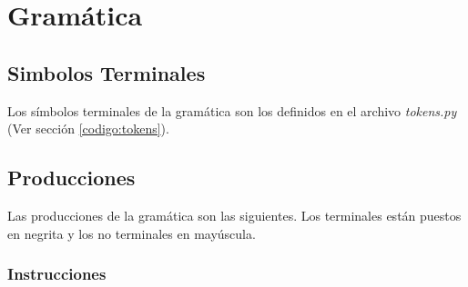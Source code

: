 \section{Gramática}
\label{sec:gramatica}

\subsection{Simbolos Terminales}
	Los símbolos terminales de la gramática son los definidos en el archivo 
	\textit{tokens.py} (Ver sección \ref{codigo:tokens}).

\subsection{Producciones}
	Las producciones de la gramática son las siguientes. Los terminales
	están puestos en negrita y los no terminales en mayúscula.
\newToken{\SEMICOLON}{;}
\newToken{\LPARENT}{(}
\newToken{\RPARENT}{)}
\newToken{\LBRACKET}{[}
\newToken{\RBRACKET}{]}
\newToken{\LBRACE}{\{}
\newToken{\RBRACE}{\}}
\newToken{\ADD}{+}
\newToken{\MULT}{*}
\newToken{\COMMA}{,}
\newToken{\SUB}{-}
\newToken{\DIV}{/}
\newToken{\COLON}{:}
\newToken{\LAMBDA}{$\lambda$}
\newToken{\LEQ}{$<=$}
\newToken{\LT}{$<$}
\newToken{\GEQ}{$>=$}
\newToken{\GT}{$>$}
\newToken{\LNOTEQ}{!=}
\newToken{\EQUAL}{==}
\newToken{\MOD}{\%}
\newToken{\POW}{\^}
\newToken{\INC}{++}
\newToken{\DEC}{--}
\newToken{\ADDEQ}{+=}
\newToken{\SUBEQ}{-=}
\newToken{\DIVEQ}{/=}
\newToken{\MULTEQ}{*=}
\newToken{\ASSIGN}{=}


\subsubsection{Instrucciones}
  \begin{reglas}
    \\	
	  \\
    \aregla{\LAMBDA}
    \\
    \aregla{\LAMBDA}
    \\
    \\
    \aregla{\LAMBDA}
  \end{reglas}

